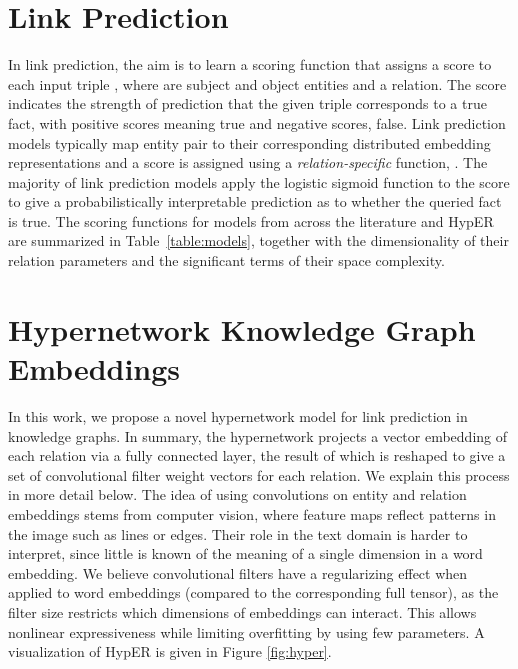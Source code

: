 \documentclass[runningheads]{llncs}
\begin{document}
\vspace{-0.3cm}
\section{Link Prediction} \label{sec:link}

In link prediction, the aim is to learn a scoring function  that assigns a score  to each input triple , where  are subject and object entities and  a relation. The score indicates the strength of prediction that the given triple corresponds to a true fact, with positive scores meaning true and negative scores, false. Link prediction models typically map entity pair  to their corresponding distributed embedding representations  and a score is assigned using a \emph{relation-specific} function, . The majority of link prediction models apply the logistic sigmoid function  to the score to give a probabilistically interpretable prediction  as to whether the queried fact is true. The scoring functions for models from across the literature and HypER are summarized in Table~\ref{table:models}, together with the dimensionality of their relation parameters and the significant terms of their space complexity.

\vspace{-0.3cm}
\section{Hypernetwork Knowledge Graph Embeddings}

In this work, we propose a novel hypernetwork model for link prediction in knowledge graphs. In summary, the hypernetwork projects a vector embedding of each relation via a fully connected layer, the result of which is reshaped to give a set of convolutional filter weight vectors for each relation. We explain this process in more detail below. The idea of using convolutions on entity and relation embeddings stems from computer vision, where feature maps reflect patterns in the image such as lines or edges. Their role in the text domain is harder to interpret, since little is known of the meaning of a single dimension in a word embedding. We believe convolutional filters have a regularizing effect when applied to word embeddings (compared to the corresponding full tensor), as the filter size restricts which dimensions of embeddings can interact. This allows nonlinear expressiveness while limiting overfitting by using few parameters. A visualization of  HypER  is given in Figure \ref{fig:hyper}.
\end{document}
